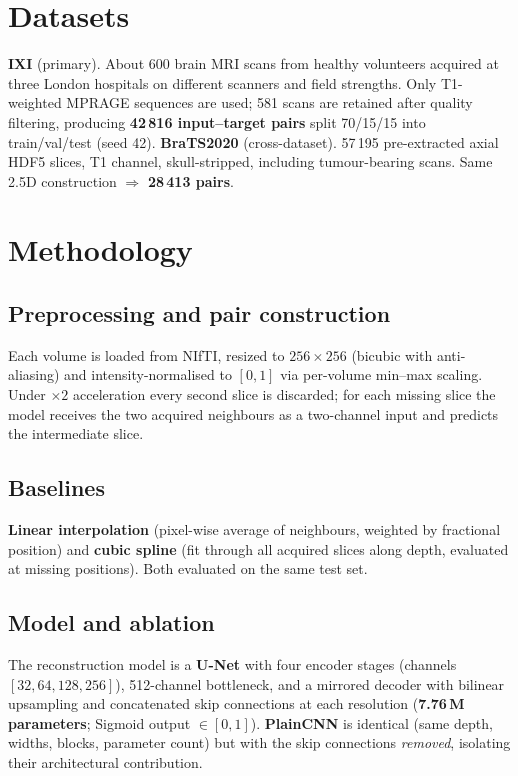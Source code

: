 \documentclass[10pt,a4paper]{article}
\begin{document}
\section{Datasets}
\textbf{IXI} (primary). About 600 brain MRI scans from healthy volunteers
acquired at three London hospitals on different scanners and field strengths.
Only T1-weighted MPRAGE sequences are used; 581 scans are retained after
quality filtering, producing \textbf{42\,816 input--target pairs} split
70/15/15 into train/val/test (seed 42).
\textbf{BraTS2020} (cross-dataset). 57\,195 pre-extracted axial HDF5 slices,
T1 channel, skull-stripped, including tumour-bearing scans. Same 2.5D
construction $\Rightarrow$ \textbf{28\,413 pairs}.

\section{Methodology}

\subsection{Preprocessing and pair construction}
Each volume is loaded from NIfTI, resized to $256\times256$ (bicubic with
anti-aliasing) and intensity-normalised to $[0,1]$ via per-volume min--max
scaling. Under $\times2$ acceleration every second slice is discarded;
for each missing slice the model receives the two acquired neighbours as a
two-channel input and predicts the intermediate slice.

\subsection{Baselines}
\textbf{Linear interpolation} (pixel-wise average of neighbours, weighted by
fractional position) and \textbf{cubic spline} (fit through all acquired
slices along depth, evaluated at missing positions). Both evaluated on the
same test set.

\subsection{Model and ablation}
The reconstruction model is a \textbf{U-Net} with four encoder stages
(channels $[32,64,128,256]$), 512-channel bottleneck, and a mirrored decoder
with bilinear upsampling and concatenated skip connections at each
resolution (\textbf{7.76\,M parameters}; Sigmoid output $\in[0,1]$).
\textbf{PlainCNN} is identical (same depth, widths, blocks, parameter count)
but with the skip connections \emph{removed}, isolating their architectural
contribution.
\end{document}
